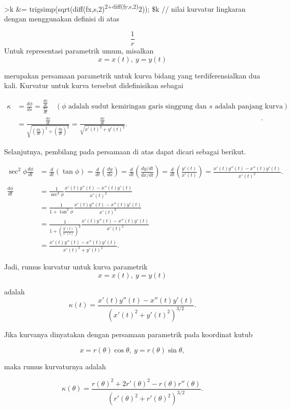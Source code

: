 \documentclass[
]{book}
\begin{document}
\textgreater k \&= trigsimp(sqrt(diff(fx,s,2)\textsuperscript{2+diff(fy,s,2)}2)); \$k // nilai kurvatur lingkaran dengan menggunakan definisi di atas

\[\frac{1}{r}\]Untuk representasi parametrik umum, misalkan \[x = x(t),\ y= y(t)\]

merupakan persamaan parametrik untuk kurva bidang yang terdiferensialkan dua kali. Kurvatur untuk kurva tersebut didefinisikan sebagai

\[\begin{aligned}\kappa &= \frac{d\phi}{ds}=\frac{\frac{d\phi}{dt}}{\frac{ds}{dt}}\quad (\phi \text{ adalah sudut kemiringan garis singgung dan }s \text{ adalah panjang kurva})\\ &=\frac{\frac{d\phi}{dt}}{\sqrt{(\frac{dx}{dt})^2+(\frac{dy}{dt})^2}}= \frac{\frac{d\phi}{dt}}{\sqrt{x'(t)^2+y'(t)^2}}.\end{aligned}.\]

Selanjutnya, pembilang pada persamaan di atas dapat dicari sebagai berikut.

\[\begin{aligned}\sec^2\phi\frac{d\phi}{dt} &= \frac{d}{dt}\left(\tan\phi\right)= \frac{d}{dt}\left(\frac{dy}{dx}\right)= \frac{d}{dt}\left(\frac{dy/dt}{dx/dt}\right)= \frac{d}{dt}\left(\frac{y'(t)}{x'(t)}\right)=\frac{x'(t)y''(t)-x''(t)y'(t)}{x'(t)^2}.\\ & \\ \frac{d\phi}{dt} &= \frac{1}{\sec^2\phi}\frac{x'(t)y''(t)-x''(t)y'(t)}{x'(t)^2}\\ &= \frac{1}{1+\tan^2\phi}\frac{x'(t)y''(t)-x''(t)y'(t)}{x'(t)^2}\\ &= \frac{1}{1+\left(\frac{y'(t)}{x'(t)}\right)^2}\frac{x'(t)y''(t)-x''(t)y'(t)}{x'(t)^2}\\ &= \frac{x'(t)y''(t)-x''(t)y'(t)}{x'(t)^2+y'(t)^2}.\end{aligned}\]

Jadi, rumus kurvatur untuk kurva parametrik \[x=x(t),\ y=y(t)\]

adalah \[\kappa(t) = \frac{x'(t)y''(t)-x''(t)y'(t)}{\left(x'(t)^2+y'(t)^2\right)^{3/2}}.\]

Jika kurvanya dinyatakan dengan persamaan parametrik pada koordinat kutub

\[x=r(\theta)\cos\theta,\ y=r(\theta)\sin\theta,\]

maka rumus kurvaturnya adalah

\[\kappa(\theta) = \frac{r(\theta)^2+2r'(\theta)^2-r(\theta)r''(\theta)}{\left(r'(\theta)^2+r'(\theta)^2\right)^{3/2}}.\]
\end{document}
